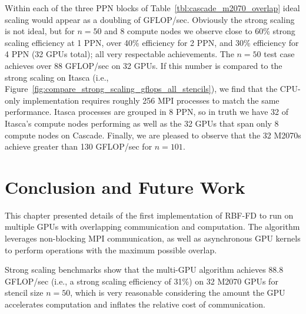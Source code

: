 Within each of the three PPN blocks of Table~\ref{tbl:cascade_m2070_overlap} ideal scaling would appear as a doubling of GFLOP/sec. Obviously the strong scaling is not ideal, but for $n=50$ and 8 compute nodes we observe close to 60\% strong scaling efficiency at 1 PPN, over 40\% efficiency for 2 PPN, and 30\% efficiency for 4 PPN (32 GPUs total); all very respectable achievements. The $n=50$ test case achieves over 88 GFLOP/sec on 32 GPUs. If this number is compared to the strong scaling on Itasca (i.e., Figure~\ref{fig:compare_strong_scaling_gflops_all_stencils}), we find that the CPU-only implementation requires roughly 256 MPI processes to match the same performance. Itasca processes are grouped in 8 PPN, so in truth we have 32 of Itasca's compute nodes performing as well as the 32 GPUs that span only 8 compute nodes on Cascade. Finally, we are pleased to observe that the 32 M2070s achieve greater than 130 GFLOP/sec for $n=101$. 


\section{Conclusion and Future Work}

This chapter presented details of the first implementation of RBF-FD to run on multiple GPUs with overlapping communication and computation. The algorithm leverages non-blocking MPI communication, as well as asynchronous GPU kernels to perform operations with the maximum possible overlap. 

Strong scaling benchmarks show that the multi-GPU algorithm achieves 88.8 GFLOP/sec (i.e., a strong scaling efficiency of 31\%) on 32 M2070 GPUs for stencil size $n=50$, which is very reasonable considering the amount the GPU accelerates computation and inflates the relative cost of communication. %

